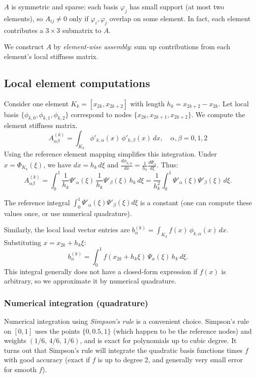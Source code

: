 \documentclass[a4paper,10pt]{article}
\begin{document}
\(A\) is symmetric and sparse: each basis \(\varphi_j\) has small support (at most two elements), so \(A_{ij}\neq 0\) only if \(\varphi_i, \varphi_j\) overlap on some element. 
In fact, each element contributes a \(3\times 3\) submatrix to \(A\).

We construct \(A\) by \emph{element-wise assembly}: sum up contributions from each element's local stiffness matrix.

\subsection*{Local element computations}
Consider one element \(K_k = [x_{2k}, x_{2k+2}]\) with length \(h_k = x_{2k+2}-x_{2k}\).
Let local basis \(\{\phi_{k,0},\phi_{k,1},\phi_{k,2}\}\) correspond to nodes \(\{x_{2k}, x_{2k+1}, x_{2k+2}\}\).
We compute the element stiffness matrix.
\[
A^{(k)}_{\alpha\beta} = \int_{K_k} \phi'_{k,\alpha}(x)\,\phi'_{k,\beta}(x)\,dx, \quad \alpha,\beta=0,1,2
\]
Using the reference element mapping simplifies this integration.
Under \(x = \Phi_{K_k}(\xi)\), we have \(dx = h_k\,d\xi\) and \(\frac{d\phi_{k,\alpha}}{dx} = \frac{1}{h_k}\frac{d\Psi_\alpha}{d\xi}\).
Thus:
\[
A^{(k)}_{\alpha\beta} 
= \int_{0}^{1} \frac{1}{h_k}\Psi'_{\alpha}(\xi)\,\frac{1}{h_k}\Psi'_{\beta}(\xi) \,h_k\,d\xi 
= \frac{1}{h_k^2}\int_{0}^{1} \Psi'_{\alpha}(\xi)\Psi'_{\beta}(\xi)\,d\xi.
\]

The reference integral \(\int_0^1 \Psi'_{\alpha}(\xi)\Psi'_{\beta}(\xi)d\xi\) is a constant (one can compute these values once, or use numerical quadrature).

Similarly, the local load vector entries are \(b^{(k)}_{\alpha} = \int_{K_k} f(x)\,\phi_{k,\alpha}(x)\,dx\).
Substituting \(x = x_{2k}+h_k\xi\):
\[b^{(k)}_{\alpha} = \int_{0}^{1} f(x_{2k}+h_k\xi)\,\Psi_{\alpha}(\xi)\,h_k\,d\xi.\]
This integral generally does not have a closed-form expression if \(f(x)\) is arbitrary, so we approximate it by numerical quadrature.

\subsubsection*{Numerical integration (quadrature)}
Numerical integration using \emph{Simpson's rule} is a convenient choice.
Simpson's rule on \([0,1]\) uses the points \(\{0, 0.5, 1\}\) (which happen to be the reference nodes) and weights \((1/6,\,4/6,\,1/6)\), and is exact for polynomials up to cubic degree. 
It turns out that Simpson's rule will integrate the quadratic basis functions times \(f\) with good accuracy (exact if \(f\) is up to degree 2, and generally very small error for smooth \(f\)). 
\end{document}
